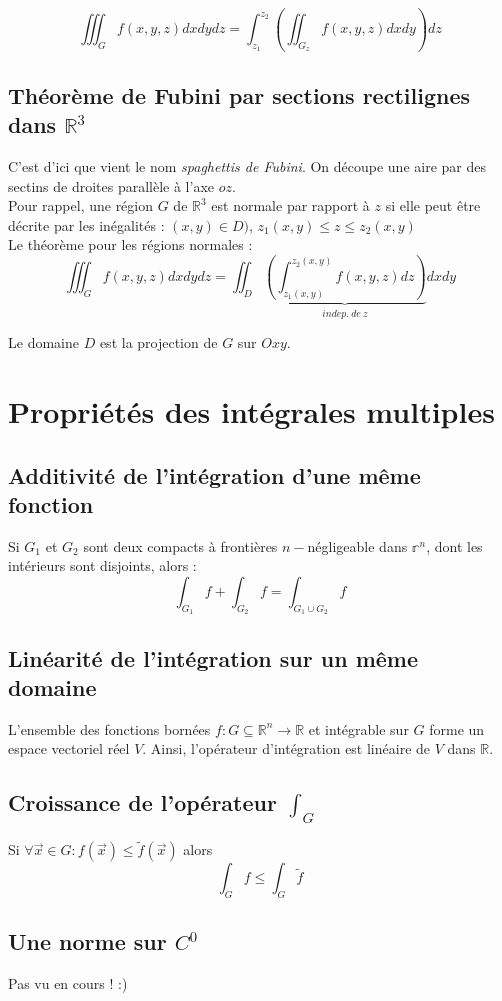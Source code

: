 \documentclass[11pt, a4paper, openany]{book}
\begin{document}
$$\iiint_G f(x,y,z)dx dy dz = \int_{z_1}^{z_2} \left( \iint_{G_z} f(x, y, z) dx dy \right) dz$$


\subsection{Théorème de Fubini par sections rectilignes dans $\mathbb{R}^3$}
C'est d'ici que vient le nom \textit{spaghettis de Fubini}. On découpe une aire par des sectins de droites parallèle à l'axe $oz$.\\
Pour rappel, une région $G$ de $\mathbb{R}^3$ est normale par rapport à $z$ si elle peut être décrite par les inégalités : $(x,y) \in D)$, $z_1(x,y) \leq z \leq z_2(x,y)$\\

Le théorème pour les régions normales :
$$\iiint_G f(x,y,z) dx dy dz = \iint_D \underbrace{\left(\int_{z_1(x,y)}^{z_2(x,y)}f(x,y, z) dz\right)}_{indep.\ de\ z} dxdy$$

Le domaine $D$ est la projection de $G$ sur $Oxy$.


\section{Propriétés des intégrales multiples}
\subsection{Additivité de l'intégration d'une même fonction}
Si $G_1$ et $G_2$ sont deux compacts à frontières $n-$négligeable dans $\mathbb{r}^n$, dont les intérieurs sont disjoints, alors : 
$$\int_{G_1} f + \int_{G_2} f = \int_{G_1 \cup G_2} f$$

\subsection{Linéarité de l'intégration sur un même domaine}
L'ensemble des fonctions bornées $f : G \subseteq \mathbb{R}^n \rightarrow \mathbb{R}$ et intégrable sur $G$ forme un espace vectoriel réel $V$. Ainsi, l'opérateur d'intégration est linéaire de $V$ dans $\mathbb{R}$.

\subsection{Croissance de l'opérateur $\int_G$}
Si $\forall \vec{x} \in G : f(\vec{x}) \leq \tilde{f}(\vec{x})$ alors
$$\int_G f \leq \int_G \tilde{f}$$

\subsection{Une norme sur $C^0$}
Pas vu en cours ! :)
\end{document}
